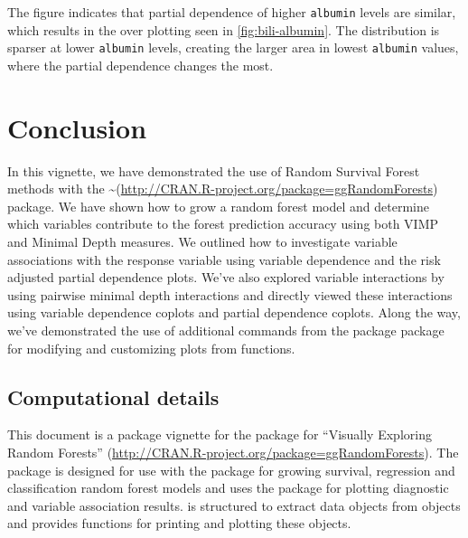 \documentclass[article]{jss}
\begin{document}
The figure indicates that partial dependence of higher \texttt{albumin}
levels are similar, which results in the over plotting seen in
\autoref{fig:bili-albumin}. The distribution is sparser at lower
\texttt{albumin} levels, creating the larger area in lowest
\texttt{albumin} values, where the partial dependence changes the most.

\section{Conclusion}\label{conclusion}

In this vignette, we have demonstrated the use of Random Survival Forest
methods with the
\textasciitilde{}(\url{http://CRAN.R-project.org/package=ggRandomForests})
package. We have shown how to grow a random forest model and determine
which variables contribute to the forest prediction accuracy using both
VIMP and Minimal Depth measures. We outlined how to investigate variable
associations with the response variable using variable dependence and
the risk adjusted partial dependence plots. We've also explored variable
interactions by using pairwise minimal depth interactions and directly
viewed these interactions using variable dependence coplots and partial
dependence coplots. Along the way, we've demonstrated the use of
additional commands from the  package
\citep[\url{http://CRAN.R-project.org/package=ggplot2}]{Wickham:2009}
package for modifying and customizing plots from 
functions.

\subsection{Computational details}\label{computational-details}

This document is a package vignette for the 
package for ``Visually Exploring Random Forests''
(\url{http://CRAN.R-project.org/package=ggRandomForests}). The
 package is designed for use with the
 package
\citep[\url{http://CRAN.R-project.org/package=randomForestSRC}]{Ishwaran:RFSRC:2014}
for growing survival, regression and classification random forest models
and uses the  package
\citep[\url{http://CRAN.R-project.org/package=ggplot2}]{Wickham:2009}
for plotting diagnostic and variable association results.
 is structured to extract data objects from
 objects and provides functions for printing and
plotting these objects.
\end{document}

